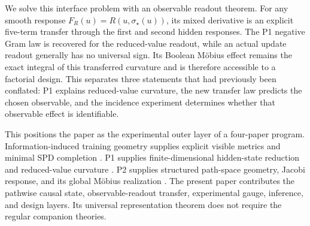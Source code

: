 We solve this interface problem with an observable readout theorem.  For any smooth response $F_R(u)=R(u,\sigma_\star(u))$, its mixed derivative is an explicit five-term transfer through the first and second hidden responses.  The P1 negative Gram law is recovered for the reduced-value readout, while an actual update readout generally has no universal sign.  Its Boolean M\"obius effect remains the exact integral of this transferred curvature and is therefore accessible to a factorial design.  This separates three statements that had previously been conflated: P1 explains reduced-value curvature, the new transfer law predicts the chosen observable, and the incidence experiment determines whether that observable effect is identifiable.

This positions the paper as the experimental outer layer of a four-paper program.  Information-induced training geometry supplies explicit visible metrics and minimal SPD completion \citep{li2026informationinducedgeometry}.  P1 supplies finite-dimensional hidden-state reduction and reduced-value curvature \citep{li2026optimizationgeometrodynamics}.  P2 supplies structured path-space geometry, Jacobi response, and its global M\"obius realization \citep{li2026restrictedcomplexity}.  The present paper contributes the pathwise causal state, observable-readout transfer, experimental gauge, inference, and design layers.  Its universal representation theorem does not require the regular companion theories.

